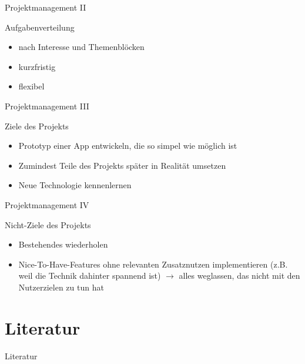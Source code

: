 \documentclass[presentation,bigger,aspectratio=169]{beamer}
\begin{document}
\begin{frame}[label={sec:org6a8c6c2}]{Projektmanagement II}
\begin{block}{Aufgabenverteilung}
\begin{itemize}
\item nach Interesse und Themenblöcken
\item kurzfristig
\item flexibel
\end{itemize}
\end{block}
\end{frame}
\begin{frame}[label={sec:org9bb4b02}]{Projektmanagement III}
\begin{block}{Ziele des Projekts}
\begin{itemize}
\item Prototyp einer App entwickeln, die so simpel wie möglich ist
\item Zumindest Teile des Projekts später in Realität umsetzen
\item Neue Technologie kennenlernen
\end{itemize}
\end{block}
\end{frame}
\begin{frame}[label={sec:orge22a6c7}]{Projektmanagement IV}
\begin{block}{Nicht-Ziele des Projekts}
\begin{itemize}
\item Bestehendes wiederholen
\item Nice-To-Have-Features ohne relevanten Zusatznutzen implementieren (z.B. weil
die Technik dahinter spannend ist) \(\to\) alles weglassen, das nicht mit
den Nutzerzielen zu tun hat
\end{itemize}
\end{block}
\end{frame}

\section*{Literatur}
\label{sec:org3e042d6}
\begin{frame}[allowframebreaks]{Literatur}
\printbibliography[heading=none]
\end{frame}
\appendix
\end{document}
